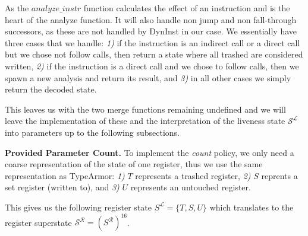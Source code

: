 As the $analyze\_instr$ function calculates the effect of an instruction and is the heart of the analyze function. It will also 
handle non jump and non fall-through successors, as these are not handled by DynInst in our case. We essentially have three cases that we handle:
\textit{1)} if the instruction is an indirect call or a direct call but we chose not follow calls, then return a state where all trashed 
are considered written,
\textit{2)}  if the instruction is a direct call and we chose to follow calls, then we spawn a new analysis and return its result, and
\textit{3)} in all other cases we simply return the decoded state.

This leaves us with the two merge functions remaining undefined and we will leave the implementation of these and the interpretation of 
the liveness state $\mathcal{S}^\mathcal{L}$ into parameters up to the following subsections.

%
%

\textbf{Provided Parameter Count.}
\label{subsection:providedparamcount}
To implement the \emph{count} policy, we only need a coarse representation of the state of one register, 
thus we use the same representation as TypeArmor:
\textit{1)} $T$ represents a trashed register,
\textit{2)} $S$ reprents a set register (written to), and
\textit{3)} $U$ represents an untouched register.

This gives us the following register state $S^\mathcal{L} = \{ T, S, U \}$ which translates to the register superstate $\mathcal{S}^\mathcal{R} = (S^\mathcal{R})^{16}$.

